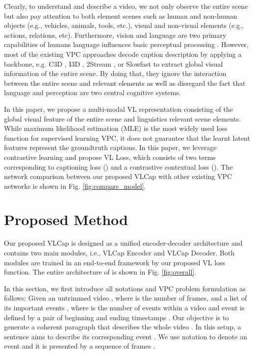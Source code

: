 \documentclass{article}
\begin{document}
Clearly, to understand and describe a video, we not only observe the entire scene but also pay attention to both element scenes such as human and non-human objects (e.g., vehicles, animals, tools, etc.), visual and non-visual elements (e.g., actions, relations, etc). Furthermore, vision and language are two primary capabilities of humans language influences basic perceptual processing \cite{Lupyan2020}. However, most of the existing VPC approaches \cite{zhou2018end, park2019adversarial, dai2019transformer, zhou2019grounded, lei2020mart, wang2021end} decode caption description by applying a backbone, e.g. C3D \cite{C3D}, I3D \cite{carreira2017quo}, 2Stream \cite{2_stream_1, 2_stream_2}, or Slowfast \cite{SlowFast} to extract global visual information of the entire scene. By doing that, they ignore the interaction between the entire scene and relevant elements as well as disregard the fact that language and perception are two central cognitive systems. 

In this paper, we propose a multi-modal VL representation consisting of the global visual feature of the entire scene and linguistics relevant scene elements. While maximum likelihood estimation (MLE) is the most widely used loss function for supervised learning VPC, it does not guarantee that the learnt latent features represent the groundtruth captions. In this paper, we leverage contrastive learning \cite{hjelm2019learning, tian2020contrastive} and propose VL Loss, which consists of two terms corresponding to captioning loss () and a contrastive contextual loss (). The network comparison between our proposed VLCap with other existing VPC networks is shown in Fig. \ref{fig:compare_model}.

\vspace{-3.8mm}
\section{Proposed Method}
\vspace{-3mm}
Our proposed VLCap is designed as a unified encoder-decoder architecture and contains two main modules, i.e., VLCap Encoder and VLCap Decoder. Both modules are trained in an end-to-end framework by our proposed VL loss function. The entire architecture of \model is shown in Fig. \ref{fig:overall}.


In this section, we first introduce all notations and VPC problem formulation as follows: Given an untrimmed video , where  is the number of frames, and a list of its important events , where  is the number of events within a video and event  is defined by a pair of beginning and ending timestamps . Our objective is to generate a coherent paragraph  that describes the whole video . In this setup, a sentence  aims to describe its corresponding event . We use notation  to denote an event and it is presented by a sequence of frames .
\vspace{-3.2mm}
\end{document}
